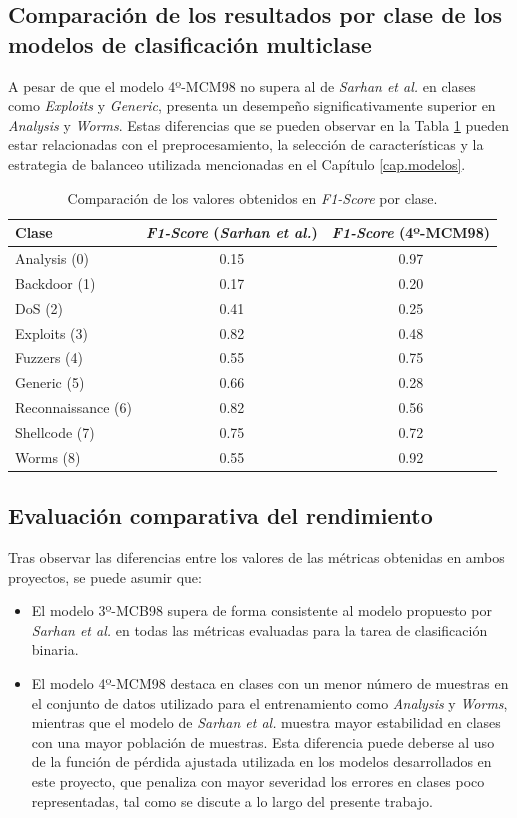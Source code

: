 \subsection{Comparación de los resultados por clase de los modelos de clasificación multiclase}

A pesar de que el modelo 4º-MCM98 no supera al de \textit{Sarhan et al.} en clases como \textit{Exploits} y \textit{Generic}, presenta un desempeño significativamente superior en \textit{Analysis} y \textit{Worms}. Estas diferencias que se pueden observar en la Tabla \ref{tab:compmulclass} pueden estar relacionadas con el preprocesamiento, la selección de características y la estrategia de balanceo utilizada mencionadas en el Capítulo \ref{cap.modelos}.

\begin{table}[H]
\centering
\begin{tabular}{|l|c|c|}
\hline
\textbf{Clase} & \textbf{\textit{F1-Score} (\textit{Sarhan et al.})} & \textbf{\textit{F1-Score} (4º-MCM98)} \\
\hline
Analysis (0) & 0.15 & 0.97 \\
Backdoor (1) & 0.17 & 0.20 \\
DoS (2) & 0.41 & 0.25 \\
Exploits (3) & 0.82 & 0.48 \\
Fuzzers (4) & 0.55 & 0.75 \\
Generic (5) & 0.66 & 0.28 \\
Reconnaissance (6) & 0.82 & 0.56 \\
Shellcode (7) & 0.75 & 0.72 \\
Worms (8) & 0.55 & 0.92 \\
\hline
\end{tabular}
\caption{Comparación de los valores obtenidos en \textit{F1-Score} por clase.}
\label{tab:compmulclass}
\end{table}


\subsection{Evaluación comparativa del rendimiento}
Tras observar las diferencias entre los valores de las métricas obtenidas en ambos proyectos, se puede asumir que:

\begin{itemize}
    \item El modelo 3º-MCB98 supera de forma consistente al modelo propuesto por \textit{Sarhan et al.} en todas las métricas evaluadas para la tarea de clasificación binaria.
  \item El modelo 4º-MCM98 destaca en clases con un menor número de muestras en el conjunto de datos utilizado para el entrenamiento como \textit{Analysis} y \textit{Worms}, mientras que el modelo de \textit{Sarhan et al.} muestra mayor estabilidad en clases con una mayor población de muestras. Esta diferencia puede deberse al uso de la función de pérdida ajustada utilizada en los modelos desarrollados en este proyecto, que penaliza con mayor severidad los errores en clases poco representadas, tal como se discute a lo largo del presente trabajo.
  
\end{itemize}


